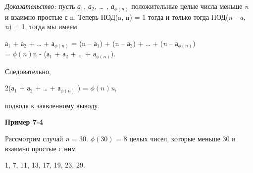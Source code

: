\documentclass[12pt]{article}
\begin{document}
	
	\textit{Доказательство:} пусть \textit{ а$_1$, а$_2$, … , а$_{\phi(n)}$}  положительные целые числа меньше \textit{n} и взаимно простые с n. Теперь НОД(a, n) = 1 тогда и только тогда НОД(\textit{n - a, n}) = 1, тогда мы имеем 
	
	\begin{center}
		а$_1$  + а$_2$ +  …  + а$_{\phi(n)}$  = (n – а$_1$) + (n – а$_2$) + … + (\textit{n} – а$_{\phi(n)}$) \\
		= $\phi(n)$n - (а$_1$  + а$_2$ +  …  + а$_{\phi(n)}$).	
	\end{center}
	
	
	Следовательно, 
	
	\begin{center}
		2(а$_1$  + а$_2$ +  …  + а$_{\phi(n)}$ ) =  $\phi(n)$\textit{n},
	\end{center}
	
	
	подводя к заявленному выводу.
	
	\begin{flushleft}
		\textbf{Пример 7-4}
	\end{flushleft}
	
	
	
	Рассмотрим случай \textit{n} = 30. $\phi(30)$ = 8 целых чисел, которые меньше 30 и взаимно простые с ним
	
	\begin{center}
		1, 7, 11, 13, 17, 19, 23, 29.
	\end{center}
	
\end{document}
